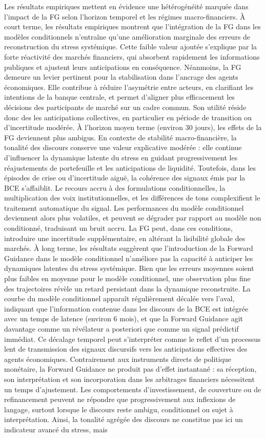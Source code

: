 Les résultats empiriques mettent en évidence une hétérogénéité marquée dans l’impact de la FG selon l’horizon temporel et les régimes macro-financiers. À court terme, les résultats empiriques montrent que l’intégration de la FG dans les modèles conditionnels n’entraîne qu’une amélioration marginale des erreurs de reconstruction du stress systémique. Cette faible valeur ajoutée s’explique par la forte réactivité des marchés financiers, qui absorbent rapidement les informations publiques et ajustent leurs anticipations en conséquence. Néanmoins, la FG demeure un levier pertinent pour la stabilisation dans l'ancrage des agents économiques. Elle contribue à réduire l’asymétrie  entre acteurs, en clarifiant les intentions de la banque centrale, et permet d’aligner plus efficacement les décisions des participants de marché sur un cadre commun. Son utilité réside donc des les anticipations collectives, en particulier en période de transition ou d’incertitude modérée. À l’horizon moyen terme (environ 30 jours), les effets de la FG deviennent plus ambigus. En contexte de stabilité macro-financière, la tonalité des discours conserve une valeur explicative modérée : elle continue d’influencer la dynamique latente du stress en guidant progressivement les réajustements de portefeuille et les anticipations de liquidité. Toutefois, dans les épisodes de crise ou d’incertitude aiguë, la cohérence des signaux émis par la BCE s’affaiblit. Le recours accru à des formulations conditionnelles, la multiplication des voix institutionnelles, et les différences de tons complexifient le traitement automatique du signal. Les performances du modèle conditionnel deviennent alors plus volatiles, et peuvent se dégrader par rapport au modèle non conditionné, traduisant un bruit accru. La FG peut, dans ces conditions, introduire une incertitude supplémentaire, en altérant la lisibilité globale des marchés. À long terme, les résultats suggèrent que l’introduction de la Forward Guidance dans le modèle conditionnel n'améliore pas la capacité à anticiper les dynamiques latentes du stress systémique. Bien que les erreurs moyennes soient plus faibles en moyenne pour le modèle conditionnel, une observation plus fine des trajectoires révèle un retard persistant dans la dynamique reconstruite. La courbe du modèle conditionnel apparaît régulièrement décalée vers l’aval, indiquant que l’information contenue dans les discours de la BCE est intégrée avec un temps de latence (environ 6 mois), et que la Forward Guidance agit davantage comme un révélateur a posteriori que comme un signal prédictif immédiat. Ce décalage temporel peut s’interpréter comme le reflet d’un processus lent de transmission des signaux discursifs vers les anticipations effectives des agents économiques. Contrairement aux instruments directs de politique monétaire, la Forward Guidance ne produit pas d’effet instantané : sa réception, son interprétation et son incorporation dans les arbitrages financiers nécessitent un temps d’ajustement. Les comportements d’investissement, de couverture ou de refinancement peuvent ne répondre que progressivement aux inflexions de langage, surtout lorsque le discours reste ambigu, conditionnel ou sujet à interprétation. Ainsi, la tonalité agrégée des discours ne constitue pas ici un indicateur avancé du stress, mais 